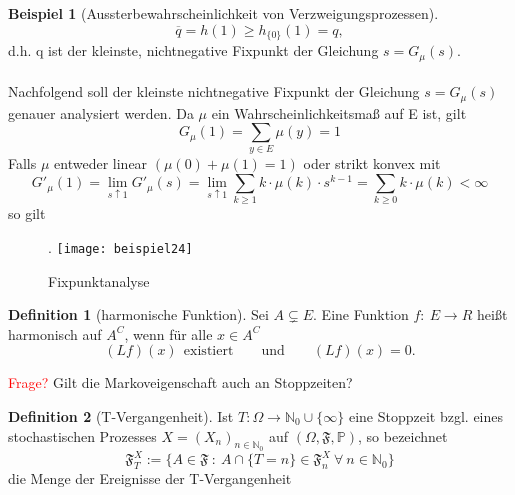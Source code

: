 \documentclass[a4paper,12pt]{scrartcl}
\theoremstyle{definition}
\newtheorem{bsp}{Beispiel}[section]
\newtheorem{defi}{Definition}[section]
\begin{document}
\begin{bsp}[Aussterbewahrscheinlichkeit von Verzweigungsprozessen]
\begin{equation*}
\overline{q} = h(1) \geq  h_{\lbrace 0 \rbrace}(1) = q,
\end{equation*}
d.h. q ist der kleinste, nichtnegative Fixpunkt der Gleichung $s = G_{\mu}(s)$.
\\
\\
Nachfolgend soll der kleinste nichtnegative Fixpunkt der Gleichung $s = G_{\mu}(s)$ genauer analysiert werden. Da $\mu$ ein Wahrscheinlichkeitsmaß auf E ist, gilt
\begin{equation*}
G_{\mu}(1) = \sum_{y \in E} \mu(y) = 1
\end{equation*}
Falls $\mu$ entweder linear $(\mu(0) + \mu(1) = 1)$  oder strikt konvex mit
\begin{equation*}
G'_{\mu}(1) = \lim_{s \uparrow 1} G'_{\mu}(s) = \lim_{s \uparrow 1} \sum_{ k \geq 1} k \cdot \mu(k) \cdot s^{k-1} = \sum_{ k \geq 0} k \cdot \mu(k) < \infty
\end{equation*}
so gilt
\begin{figure}[H].
\centering
\texttt{[image: beispiel24]}
\caption{Fixpunktanalyse}
\end{figure}
\noindent
\end{bsp}
\noindent
\begin{defi}[harmonische Funktion]
Sei $A \subsetneq E$. Eine Funktion $f: \: E \to R$ heißt harmonisch auf $A^{C}$, wenn für alle $x \in A^{C}$
\begin{equation*}
(Lf)(x) \: \: \mathrm{existiert} \qquad \mathrm{und} \qquad (Lf)(x) = 0.
\end{equation*}
\end{defi}
\noindent
\textcolor{red}{Frage?} Gilt die Markoveigenschaft auch an Stoppzeiten?
\begin{defi}[T-Vergangenheit]
\label{T-Vergangenheit}
Ist $T: \Omega \to \mathbb{N}_{0} \cup \lbrace \infty \rbrace$ eine Stoppzeit bzgl. eines stochastischen Prozesses $X = (X_{n})_{n \in \mathbb{N}_{0}}$ auf $(\Omega, \mathfrak{F}, \mathbb{P})$, so bezeichnet
\begin{equation*}
\mathfrak{F}_{T}^{X} := \lbrace A \in \mathfrak{F} \: : \: A \cap \lbrace T = n \rbrace \in \mathfrak{F}_{n}^{X} \: \forall \: n \in \mathbb{N}_{0} \rbrace
\end{equation*}
die Menge der Ereignisse der T-Vergangenheit
\end{defi}
\end{document}
